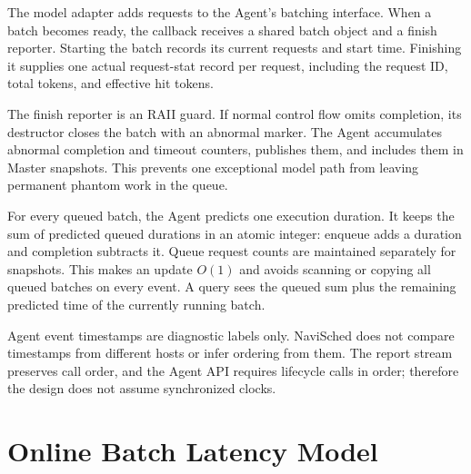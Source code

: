 \documentclass[10pt]{article}
\newcommand{\system}{NaviSched\xspace}
\begin{document}
The model adapter adds requests to the Agent's batching interface. When a
batch becomes ready, the callback receives a shared batch object and a finish
reporter. Starting the batch records its current requests and start time.
Finishing it supplies one actual request-stat record per request, including
the request ID, total tokens, and effective hit tokens.

The finish reporter is an RAII guard. If normal control flow omits completion,
its destructor closes the batch with an abnormal marker. The Agent accumulates
abnormal completion and timeout counters, publishes them, and includes them in
Master snapshots. This prevents one exceptional model path from leaving
permanent phantom work in the queue.

For every queued batch, the Agent predicts one execution duration. It keeps
the sum of predicted queued durations in an atomic integer: enqueue adds a
duration and completion subtracts it. Queue request counts are maintained
separately for snapshots. This makes an update $O(1)$ and avoids scanning or
copying all queued batches on every event. A query sees the queued sum plus
the remaining predicted time of the currently running batch.

Agent event timestamps are diagnostic labels only. \system does not compare
timestamps from different hosts or infer ordering from them. The report stream
preserves call order, and the Agent API requires lifecycle calls in order;
therefore the design does not assume synchronized clocks.

\section{Online Batch Latency Model}
\label{sec:model}
\end{document}
